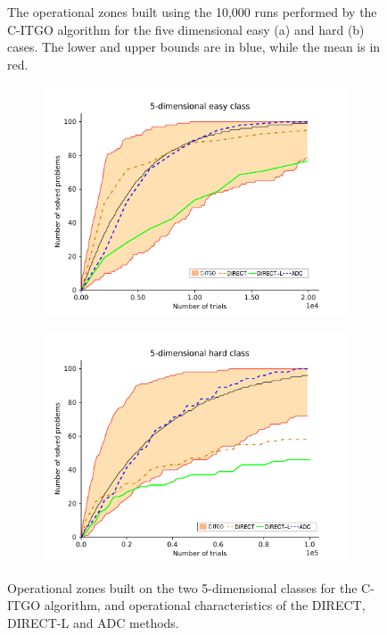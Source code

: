 \begin{figure}[h]
\begin{subfigure}{.5\textwidth}
      \caption{}
      \label{fig:OpZone_b}
    \end{subfigure}
    \caption{The operational zones built using the 10,000 runs performed by the C-ITGO algorithm for the five dimensional easy (a) and hard (b) cases. The lower and upper bounds are in blue, while the mean is in red.}\label{fig:OpZone}
\end{figure}


\begin{figure}[h]
    \centering
    \begin{subfigure}{.5\textwidth}
      \centering
      \includegraphics[width=1.1\linewidth]{img/GKLS/fill_5E_edit}
      \caption{}
      \label{fig:OpCarac_a}
    \end{subfigure}%
    \begin{subfigure}{.5\textwidth}
      \centering
      \includegraphics[width=1.1\linewidth]{img/GKLS/fill_5H_edit}
      \caption{}
      \label{fig:OpCarac_b}
    \end{subfigure}
    \caption{Operational zones built on the two 5-dimensional classes for the C-ITGO algorithm, and operational characteristics of the DIRECT, DIRECT-L and ADC methods.}\label{fig:OpCarac}
\end{figure}


